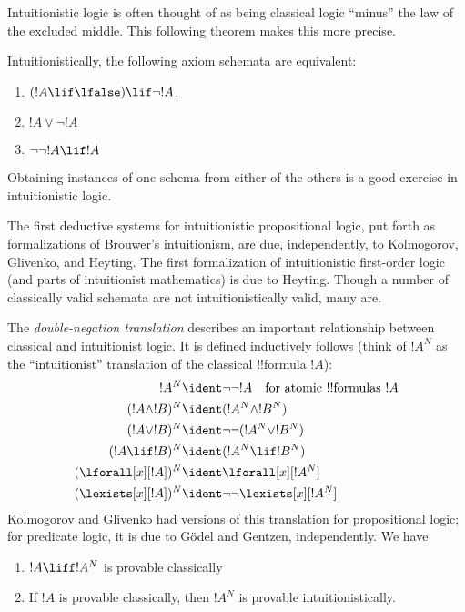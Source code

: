 \documentclass[../../../include/open-logic-section]{subfiles}
\begin{document}
Intuitionistic logic is often thought of as being classical logic
``minus'' the law of the excluded middle. This following theorem makes
this more precise.
\begin{thm}
Intuitionistically, the following axiom schemata are equivalent:
\begin{enumerate}
\item $(!A \lif \lfalse) \lif \lnot !A$.
\item $!A \lor \lnot !A$
\item $\lnot \lnot !A \lif !A$
\end{enumerate}
\end{thm}
Obtaining instances of one schema from either of the others is a good
exercise in intuitionistic logic.

The first deductive systems for intuitionistic propositional
logic, put forth as formalizations of Brouwer's intuitionism, are due,
independently, to Kolmogorov, Glivenko, and Heyting. The first
formalization of intuitionistic first-order logic (and parts of
intuitionist mathematics) is due to Heyting. Though a number of
classically valid schemata are not intuitionistically valid, many are.

The \emph{double-negation translation} describes an important
relationship between classical and intuitionist logic. It is defined
inductively follows (think of $!A^N$ as the ``intuitionist''
translation of the classical !!{formula} $!A$):
\begin{align*}
!A^N & \ident \lnot\lnot !A \quad \text{for atomic !!{formula}s $!A$} \\
(!A \land !B)^N & \ident (!A^N \land !B^N) \\
(!A \lor !B)^N & \ident  \lnot\lnot (!A^N \lor !B^N) \\
(!A \lif !B)^N & \ident (!A^N \lif !B^N) \\
(\lforall[x][!A])^N & \ident \lforall[x][!A^N] \\
(\lexists[x][!A])^N & \ident \lnot\lnot\lexists[x][!A^N]
\end{align*}
Kolmogorov and Glivenko had versions of this translation for
propositional logic; for predicate logic, it is due to G\"odel and
Gentzen, independently. We have

\begin{thm}
\begin{enumerate}
\item $!A \liff !A^N$ is provable classically
\item If $!A$ is provable classically, then $!A^N$ is provable
  intuitionistically.
\end{enumerate}
\end{thm}
\end{document}
